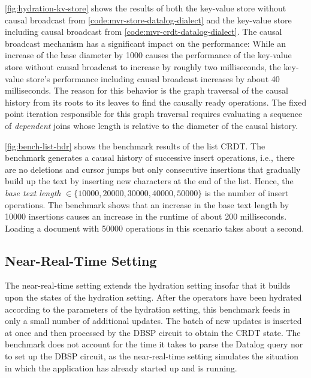 

\ref{fig:hydration-kv-store} shows the results of both the key-value store
without causal broadcast from \ref{code:mvr-store-datalog-dialect} and the
key-value store including causal broadcast from \ref{code:mvr-crdt-datalog-dialect}.
The causal broadcast mechanism has a significant impact on the performance:
While an increase of the base diameter by 1000 causes the performance of the
key-value store without causal broadcast to increase by roughly two milliseconds,
the key-value store's performance including causal broadcast increases by about
40 milliseconds.
The reason for this behavior is the graph traversal of the causal history from its
roots to its leaves to find the causally ready operations.
The fixed point iteration responsible for this graph traversal requires evaluating
a sequence of \emph{dependent} joins whose length is relative to the diameter
of the causal history.



\ref{fig:bench-list-hdr} shows the benchmark results of the list \ac{CRDT}.
The benchmark generates a causal history of successive insert operations, i.e.,
there are no deletions and cursor jumps but only consecutive insertions that
gradually build up the text by inserting new characters at the end of the list.
Hence, the \emph{base text length} \(\in \{10000, 20000, 30000, 40000, 50000\}\)
is the number of insert operations.
The benchmark shows that an increase in the base text length by 10000 insertions
causes an increase in the runtime of about 200 milliseconds.
Loading a document with 50000 operations in this scenario takes about a second.

\subsection{Near-Real-Time Setting}\label{sec:bench-nrt}

The near-real-time setting extends the hydration setting insofar that it builds
upon the states of the hydration setting.
After the operators have been hydrated according to the parameters of the
hydration setting, this benchmark feeds in only a small number of additional updates.
The batch of new updates is inserted at once and then processed by the DBSP circuit
to obtain the \ac{CRDT} state.
The benchmark does not account for the time it takes to parse the Datalog query
nor to set up the DBSP circuit, as the near-real-time setting simulates
the situation in which the application has already started up and is running.

